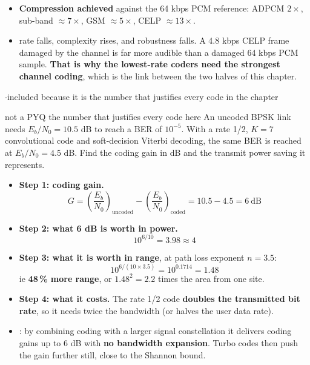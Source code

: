 \begin{itemize}
  \item \textbf{Compression achieved} against the 64 kbps PCM reference:
        ADPCM $2\times$, sub-band $\approx 7\times$, GSM $\approx 5\times$,
        CELP $\approx 13\times$.
  \item {} rate falls, complexity rises, and robustness falls.
        A 4.8 kbps CELP frame damaged by the channel is far more audible than a damaged
        64 kbps PCM sample. \textbf{That is why the lowest-rate coders need the strongest channel
        coding}, which is the link between the two halves of this chapter.
\end{itemize}

\hr

{\color{sub}\footnotesize {} \gap$\cdot$\gap included because
it is the number that justifies every code in the chapter}

\begin{asked}[PROBLEM]{not a PYQ \textperiodcentered{} the number that justifies every code here \added}
An uncoded BPSK link needs $E_b/N_0 = 10.5$ dB to reach a BER of $10^{-5}$. With a rate 1/2,
$K = 7$ convolutional code and soft-decision Viterbi decoding, the same BER is reached at
$E_b/N_0 = 4.5$ dB. Find the coding gain in dB and the transmit power saving it represents.
\end{asked}

\begin{itemize}
  \item \textbf{Step 1: coding gain.}
        \[ G = \left(\frac{E_b}{N_0}\right)_{\text{uncoded}}
             - \left(\frac{E_b}{N_0}\right)_{\text{coded}}
             = 10.5 - 4.5 = \boxed{6\ \text{dB}} \]
  \item \textbf{Step 2: what 6 dB is worth in power.}
        \[ 10^{6/10} = 3.98 \approx 4 \]
  \item \textbf{Step 3: what it is worth in range}, at path loss exponent $n = 3.5$:
        \[ 10^{6/(10 \times 3.5)} = 10^{0.1714} = 1.48 \]
        ie \textbf{48\,\% more range}, or $1.48^2 = 2.2$ times the area from one site.
  \item \textbf{Step 4: what it costs.} The rate 1/2 code \textbf{doubles the transmitted bit
        rate}, so it needs twice the bandwidth (or halves the user data rate).
  \item {}: by combining coding with a larger signal
        constellation it delivers coding gains up to 6 dB with \textbf{no bandwidth expansion}.
        Turbo codes then push the gain further still, close to the Shannon bound.
\end{itemize}
